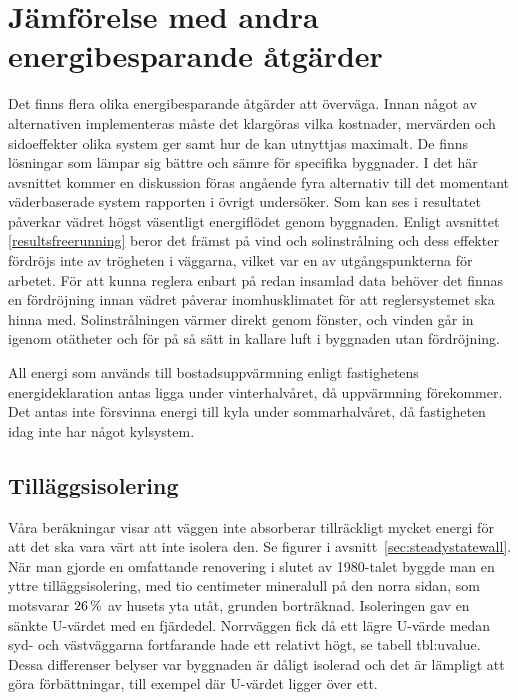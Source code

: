 \section{Jämförelse med andra energibesparande åtgärder}

Det finns flera olika energibesparande åtgärder att överväga. Innan något av alternativen implementeras måste det klargöras vilka kostnader, mervärden och sidoeffekter olika system ger samt hur de kan utnyttjas maximalt. De finns lösningar som lämpar sig bättre och sämre för specifika byggnader. I det här avsnittet kommer en diskussion föras angående fyra alternativ till det momentant väderbaserade system rapporten i övrigt undersöker.
Som kan ses i resultatet påverkar vädret högst väsentligt energiflödet genom byggnaden. Enligt avsnittet \ref{resultsfreerunning} beror det främst på vind och solinstrålning och dess effekter fördröjs inte av trögheten i väggarna, vilket var en av utgångspunkterna för arbetet. För att kunna reglera enbart på redan insamlad data behöver det finnas en fördröjning innan vädret påverar inomhusklimatet för att reglersystemet ska hinna med. Solinstrålningen värmer direkt genom fönster, och vinden går in igenom otätheter och för på så sätt in kallare luft i byggnaden utan fördröjning.

All energi som används till bostadsuppvärmning enligt fastighetens energideklaration\cite{energideklaration} antas ligga under vinterhalvåret, då uppvärmning förekommer. Det antas inte försvinna energi till kyla under sommarhalvåret, då fastigheten idag inte har något kylsystem.

\subsection{Tilläggsisolering}
Våra beräkningar visar att väggen inte absorberar tillräckligt mycket energi för att det ska vara värt att inte isolera den. Se figurer i avsnitt~\ref{sec:steadystatewall}.
När man gjorde en omfattande renovering i slutet av 1980-talet byggde man en yttre tilläggsisolering, med tio centimeter mineralull på den norra sidan\cite{arsredovisning}, som motsvarar $\unit[26]{\%}$ av husets yta utåt, grunden borträknad. Isoleringen gav en sänkte U-värdet med en fjärdedel. Norrväggen fick då ett lägre U-värde medan syd- och västväggarna fortfarande hade ett relativt högt, se tabell {tbl:uvalue}.
Dessa differenser belyser var byggnaden är dåligt isolerad och det är lämpligt att göra förbättningar, till exempel där U-värdet ligger över ett.

